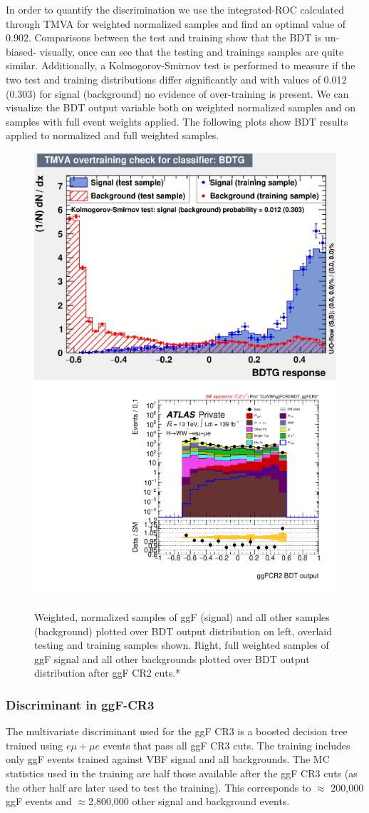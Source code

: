 In order to quantify the discrimination we use the integrated-ROC calculated through TMVA for weighted normalized samples and find an optimal value of 0.902. Comparisons between the test and training show that the BDT is un-biased- visually, once can see that the testing and trainings samples are quite similar. Additionally, a Kolmogorov-Smirnov test is performed to measure if the two test and training distributions differ significantly and with values of 0.012 (0.303) for signal (background) no evidence of over-training is present. We can visualize the BDT output variable both on weighted normalized samples and on samples with full event weights applied. The following plots show BDT results applied to normalized and full weighted samples.

\begin{figure}[!htbp]
\centering
  \includegraphics[width=.4\linewidth]{Pictures/ggFCR2/overtrain_BDTG.eps}
  \includegraphics[width=.45\linewidth]{Pictures/run2-emme-CutVBFggFCR2-BDT_ggFCR2-log.pdf}
\caption{Weighted, normalized samples of ggF (signal) and all other samples (background) plotted over BDT output distribution on left, overlaid testing and training samples shown. Right, full weighted samples of ggF signal and all other backgrounds plotted over BDT output distribution after ggF CR2 cuts.*}
\label{fig:ggFCR2BDTresult}
\end{figure}

\subsubsection{Discriminant in ggF-CR3}

The multivariate discriminant used for the ggF CR3 is a boosted decision tree trained using $e\mu+\mu e$ events that pass all ggF CR3 cuts. The training includes only ggF events trained against VBF signal and all backgrounds. The MC statistics used in the training are half those available after the ggF CR3 cuts (as the other half are later used to test the training). This corresponds to $\approx$ 200,000 ggF events and $\approx$2,800,000 other signal and background events.

